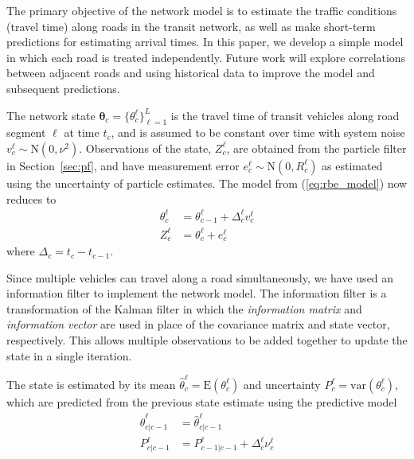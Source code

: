 The primary objective of the network model is to estimate the \rt traffic conditions
(travel time) along roads in the transit network, 
as well as make short-term predictions for estimating arrival times.
In this paper, we develop a simple model in which each road is treated independently.
Future work will explore correlations between adjacent roads and using historical data
to improve the model and subsequent predictions.


The network state $\boldsymbol\theta_c = \{\theta_c^\ell\}_{\ell = 1}^L$ is the travel time 
of transit vehicles along road segment $\ell$ at time $t_c$,
and is assumed to be constant over time 
with system noise $v_c^\ell \sim \mathrm{N}(0, \nu^2)$.
Observations of the state, $Z_c^\ell$, are obtained from the particle filter in Section~\ref{sec:pf},
and have measurement error $e_c^\ell \sim \mathrm{N}(0, R_c^\ell)$ as estimated 
using the uncertainty of particle estimates.
The model from (\ref{eq:rbe_model}) now reduces to
\begin{equation}
\begin{split}
\theta_c^\ell &= \theta_{c-1}^\ell + \Delta_c^\ell v_c^\ell \\
Z_c^\ell &= \theta_c^\ell + e_c^\ell
\end{split}
\end{equation}
where $\Delta_c = t_c - t_{c-1}$.


Since multiple vehicles can travel along a road simultaneously,
we have used an information filter to implement the network model.
The information filter is a transformation of the Kalman filter in which the
\emph{information matrix} and \emph{information vector} are used in place of 
the covariance matrix and state vector, respectively.
This allows multiple observations to be added together to update the state
in a single iteration.


The state is estimated by its mean $\hat \theta_c^\ell = \mathrm{E}(\theta_c^\ell)$
and uncertainty $P_c^\ell = \mathrm{var}(\theta_c^\ell)$,
which are predicted from the previous state estimate using the predictive model
\begin{align*}
\label{eq:kf_transition}
\hat \theta^\ell_{c|c-1} &= \hat \theta^\ell_{c|c-1} \\
P^\ell_{c|c-1} &= P^\ell_{c-1|c-1} + \Delta_c^\ell \nu_c^\ell
\end{align*}

